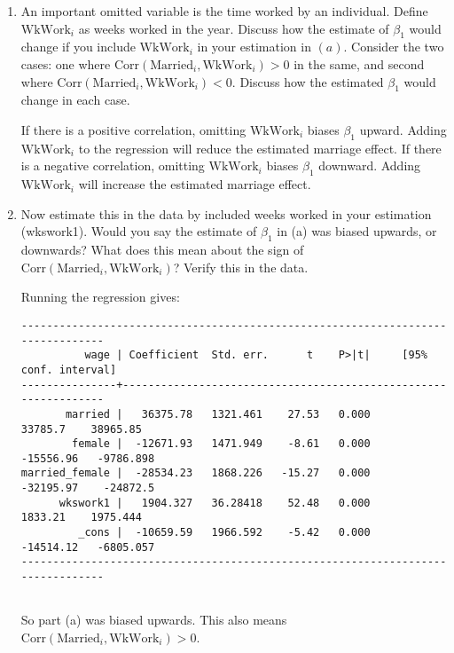 \documentclass[11pt,twoside,openany]{memoir}
\begin{document}
\begin{question}
\begin{enumerate}[label = (\alph*),itemsep=1pt,topsep=3pt]
        \item An important omitted variable is the time worked by an individual. Define $\text{WkWork}_i$ as weeks worked in the year. Discuss how the estimate of $\beta_1$ would change if you include $\text{WkWork}_i$ in your estimation in $(a)$. Consider the two cases: one where $\text{Corr}(\text{Married}_i, \text{WkWork}_i) > 0$ in the same, and second where $\text{Corr}(\text{Married}_i, \text{WkWork}_i) < 0$. Discuss how the estimated $\beta_1$ would change in each case.
            {\color{blue} \begin{solution}
                If there is a positive correlation, omitting $\text{WkWork}_i$ biases $\beta_1$ upward. Adding $\text{WkWork}_i$ to the regression will reduce the estimated marriage effect. If there is a negative correlation, omitting $\text{WkWork}_i$ biases $\beta_1$ downward. Adding $\text{WkWork}_i$ will increase the estimated marriage effect.
            \end{solution}}

        \item Now estimate this in the data by included weeks worked in your estimation (wkswork1). Would you say the estimate of $\beta_1$ in (a) was biased upwards, or downwards? What does this mean about the sign of $\text{Corr}(\text{Married}_i, \text{WkWork}_i)$? Verify this in the data.
            {\color{blue} \begin{solution}
                Running the regression gives:
                \begin{Verbatim}
--------------------------------------------------------------------------------
          wage | Coefficient  Std. err.      t    P>|t|     [95% conf. interval]
---------------+----------------------------------------------------------------
       married |   36375.78   1321.461    27.53   0.000      33785.7    38965.85
        female |  -12671.93   1471.949    -8.61   0.000    -15556.96   -9786.898
married_female |  -28534.23   1868.226   -15.27   0.000    -32195.97    -24872.5
      wkswork1 |   1904.327   36.28418    52.48   0.000      1833.21    1975.444
         _cons |  -10659.59   1966.592    -5.42   0.000    -14514.12   -6805.057
--------------------------------------------------------------------------------
                
                \end{Verbatim}
                So part (a) was biased upwards. This also means $\text{Corr}(\text{Married}_i, \text{WkWork}_i) > 0$.
            \end{solution}}


\end{enumerate}
\end{question}
\end{document}
